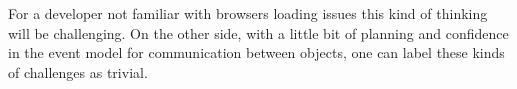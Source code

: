 \documentclass[english]{ifimaster}
\begin{document}
For a developer not familiar with browsers loading issues this kind of thinking will be challenging. On the other side, with a little bit of planning and confidence in the event model for communication between objects, one can label these kinds of challenges as trivial. 




















\end{document}
